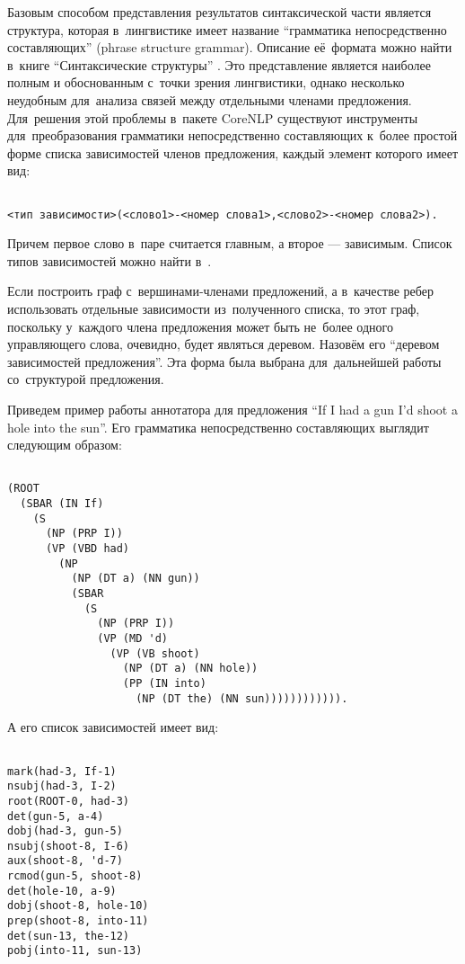 Базовым способом представления результатов синтаксической части является структура,
которая в~лингвистике имеет название ``грамматика непосредственно составляющих'' (phrase structure grammar). 
Описание её~формата можно найти в~книге ``Синтаксические структуры'' \cite{homsky}.
Это представление является наиболее полным и обоснованным с~точки зрения лингвистики, 
однако несколько неудобным для~анализа связей между отдельными членами предложения.
Для~решения этой проблемы в~пакете CoreNLP существуют инструменты 
для~преобразования грамматики непосредственно составляющих к~более простой форме списка зависимостей членов предложения, 
каждый элемент которого имеет вид:

\begin{verbatim}

<тип зависимости>(<слово1>-<номер слова1>,<слово2>-<номер слова2>).

\end{verbatim}

Причем первое слово в~паре считается главным, а второе --- зависимым.
Список типов зависимостей можно найти в~\cite{dependencies}.

Если построить граф с~вершинами-членами предложений, а в~качестве ребер использовать отдельные зависимости из~полученного списка, 
то этот граф, поскольку у~каждого члена предложения может быть не~более одного управляющего слова, 
очевидно, будет являться деревом. 
Назовём его ``деревом зависимостей предложения''.
Эта форма была выбрана для~дальнейшей работы со~структурой предложения.

Приведем пример работы аннотатора для предложения ``If I had a gun I'd shoot a hole into the sun''.
Его грамматика непосредственно составляющих выглядит следующим образом:

\begin{verbatim}

(ROOT
  (SBAR (IN If)
    (S
      (NP (PRP I))
      (VP (VBD had)
        (NP
          (NP (DT a) (NN gun))
          (SBAR
            (S
              (NP (PRP I))
              (VP (MD 'd)
                (VP (VB shoot)
                  (NP (DT a) (NN hole))
                  (PP (IN into)
                    (NP (DT the) (NN sun)))))))))))).

\end{verbatim}

А его список зависимостей имеет вид:

\begin{verbatim}

mark(had-3, If-1)
nsubj(had-3, I-2)
root(ROOT-0, had-3)
det(gun-5, a-4)
dobj(had-3, gun-5)
nsubj(shoot-8, I-6)
aux(shoot-8, 'd-7)
rcmod(gun-5, shoot-8)
det(hole-10, a-9)
dobj(shoot-8, hole-10)
prep(shoot-8, into-11)
det(sun-13, the-12)
pobj(into-11, sun-13)

\end{verbatim}

